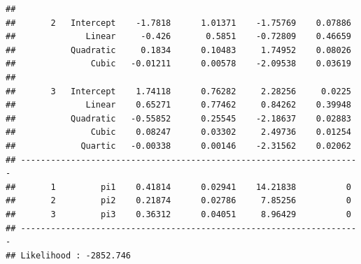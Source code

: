 \documentclass{article}\usepackage[]{graphicx}\usepackage[]{color}
\makeatletter
\newenvironment{kframe}{%
 \def\at@end@of@kframe{}%
 \ifinner\ifhmode%
  \def\at@end@of@kframe{\end{minipage}}%
  \begin{minipage}{\columnwidth}%
 \fi\fi%
 \def\FrameCommand##1{\hskip\@totalleftmargin \hskip-\fboxsep
 \colorbox{shadecolor}{##1}\hskip-\fboxsep
     \hskip-\linewidth \hskip-\@totalleftmargin \hskip\columnwidth}%
 \MakeFramed {\advance\hsize-\width
   \@totalleftmargin\z@ \linewidth\hsize
   \@setminipage}}%
 {\par\unskip\endMakeFramed%
 \at@end@of@kframe}
\newenvironment{knitrout}{}{} %
\makeatother
\begin{document}
\begin{knitrout}
\begin{kframe}
\begin{verbatim}
##                                                                     
##       2   Intercept    -1.7818      1.01371    -1.75769    0.07886  
##              Linear     -0.426       0.5851    -0.72809    0.46659  
##           Quadratic     0.1834      0.10483     1.74952    0.08026  
##               Cubic   -0.01211      0.00578    -2.09538    0.03619  
##                                                                     
##       3   Intercept    1.74118      0.76282     2.28256     0.0225  
##              Linear    0.65271      0.77462     0.84262    0.39948  
##           Quadratic   -0.55852      0.25545    -2.18637    0.02883  
##               Cubic    0.08247      0.03302     2.49736    0.01254  
##             Quartic   -0.00338      0.00146    -2.31562    0.02062  
## --------------------------------------------------------------------
##       1         pi1    0.41814      0.02941    14.21838          0  
##       2         pi2    0.21874      0.02786     7.85256          0  
##       3         pi3    0.36312      0.04051     8.96429          0  
## --------------------------------------------------------------------
## Likelihood : -2852.746
\end{verbatim}
\end{kframe}
\end{knitrout}
\end{document}
